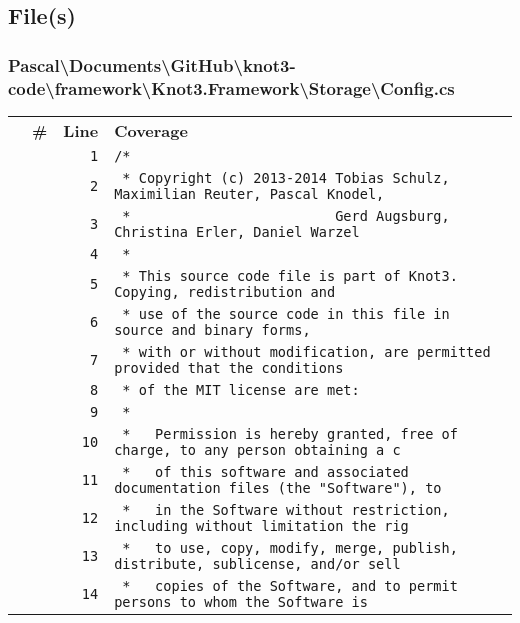 \documentclass[a4paper,10pt]{article}
\begin{document}
\subsection{File(s)}
\subsubsection{Pascal\textbackslash Documents\textbackslash GitHub\textbackslash knot3-code\textbackslash framework\textbackslash Knot3.Framework\textbackslash Storage\textbackslash Config.cs}
\begin{longtable}[l]{lrrl}
\textbf{} & \textbf{\#} & \textbf{Line} & \textbf{Coverage}\\
\cellcolor{gray} &  & \verb~1~ & \verb~/*~\\
\cellcolor{gray} &  & \verb~2~ & \verb~ * Copyright (c) 2013-2014 Tobias Schulz, Maximilian Reuter, Pascal Knodel,~\\
\cellcolor{gray} &  & \verb~3~ & \verb~ *                         Gerd Augsburg, Christina Erler, Daniel Warzel~\\
\cellcolor{gray} &  & \verb~4~ & \verb~ *~\\
\cellcolor{gray} &  & \verb~5~ & \verb~ * This source code file is part of Knot3. Copying, redistribution and~\\
\cellcolor{gray} &  & \verb~6~ & \verb~ * use of the source code in this file in source and binary forms,~\\
\cellcolor{gray} &  & \verb~7~ & \verb~ * with or without modification, are permitted provided that the conditions~\\
\cellcolor{gray} &  & \verb~8~ & \verb~ * of the MIT license are met:~\\
\cellcolor{gray} &  & \verb~9~ & \verb~ *~\\
\cellcolor{gray} &  & \verb~10~ & \verb~ *   Permission is hereby granted, free of charge, to any person obtaining a c~\\
\cellcolor{gray} &  & \verb~11~ & \verb~ *   of this software and associated documentation files (the "Software"), to ~\\
\cellcolor{gray} &  & \verb~12~ & \verb~ *   in the Software without restriction, including without limitation the rig~\\
\cellcolor{gray} &  & \verb~13~ & \verb~ *   to use, copy, modify, merge, publish, distribute, sublicense, and/or sell~\\
\cellcolor{gray} &  & \verb~14~ & \verb~ *   copies of the Software, and to permit persons to whom the Software is~\\

\end{longtable}
\end{document}
